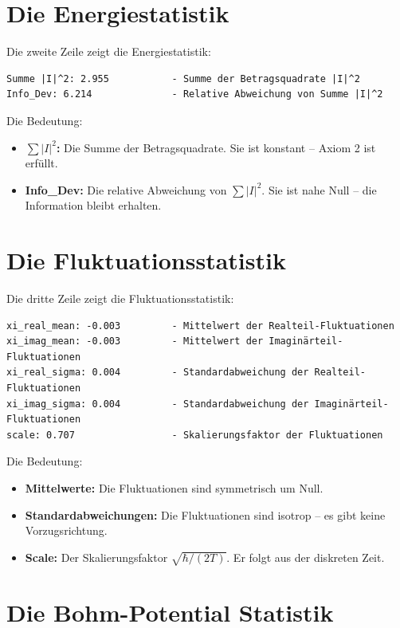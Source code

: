 \section{Die Energiestatistik}

Die zweite Zeile zeigt die Energiestatistik:

\begin{verbatim}
Summe |I|^2: 2.955           - Summe der Betragsquadrate |I|^2
Info_Dev: 6.214              - Relative Abweichung von Summe |I|^2
\end{verbatim}

Die Bedeutung:

\begin{itemize}
\item \textbf{\( \sum |I|^2 \):} Die Summe der Betragsquadrate. Sie ist konstant – Axiom 2 ist erfüllt.
\item \textbf{Info\_Dev:} Die relative Abweichung von \( \sum |I|^2 \). Sie ist nahe Null – die Information bleibt erhalten.
\end{itemize}

\section{Die Fluktuationsstatistik}

Die dritte Zeile zeigt die Fluktuationsstatistik:

\begin{verbatim}
xi_real_mean: -0.003         - Mittelwert der Realteil-Fluktuationen
xi_imag_mean: -0.003         - Mittelwert der Imaginärteil-Fluktuationen
xi_real_sigma: 0.004         - Standardabweichung der Realteil-Fluktuationen
xi_imag_sigma: 0.004         - Standardabweichung der Imaginärteil-Fluktuationen
scale: 0.707                 - Skalierungsfaktor der Fluktuationen
\end{verbatim}

Die Bedeutung:

\begin{itemize}
\item \textbf{Mittelwerte:} Die Fluktuationen sind symmetrisch um Null.
\item \textbf{Standardabweichungen:} Die Fluktuationen sind isotrop – es gibt keine Vorzugsrichtung.
\item \textbf{Scale:} Der Skalierungsfaktor \( \sqrt{\hbar/(2T)} \). Er folgt aus der diskreten Zeit.
\end{itemize}

\section{Die Bohm-Potential Statistik}

